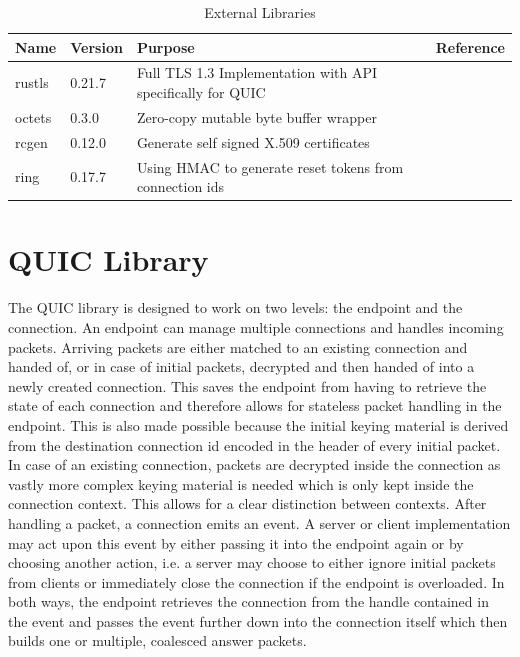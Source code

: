 \begin{table}[H]
\begin{center}
    \begin{tabular}{| l | l | p{97mm} | l |}
    \hline
    \textbf{Name} & \textbf{Version} & \textbf{Purpose} & \textbf{Reference} \\ \hline
    rustls & 0.21.7 & Full TLS 1.3 Implementation with API specifically for QUIC & \cite{rustls} \\ \hline
    octets & 0.3.0 & Zero-copy mutable byte buffer wrapper & \cite{octets} \\ \hline
    rcgen & 0.12.0 & Generate self signed X.509 certificates & \cite{rcgen} \\ \hline
    ring & 0.17.7 & Using HMAC to generate reset tokens from connection ids & \cite{ring} \\ \hline
    \end{tabular}
\end{center}
\caption{External Libraries}
\label{ext_libs}
\end{table}

\section{QUIC Library} \label{quic_lib}

The QUIC library is designed to work on two levels: the endpoint and the connection. An endpoint can manage multiple connections and
handles incoming packets. Arriving packets are either matched to an existing connection and handed of, or in case of initial
packets, decrypted and then handed of into a newly created connection. This saves the endpoint from having to
retrieve the state of each connection and therefore allows for stateless packet handling in the endpoint. This is also made possible
because the initial keying material is derived from the destination connection id encoded in the header of every initial packet. In
case of an existing connection, packets are decrypted inside the connection as vastly more complex keying material is needed which
is only kept inside the
connection context. This allows for a clear distinction between contexts. After handling a packet, a connection emits an
event. A server or client implementation may act upon this event by either passing it into the endpoint again or by choosing
another action, i.e. a server may choose to either ignore initial packets from clients or immediately close the connection if the
endpoint is overloaded. In both ways, the endpoint retrieves the connection from the handle contained in the event and passes the
event further down into the connection itself which then builds one or multiple, coalesced answer packets. 

